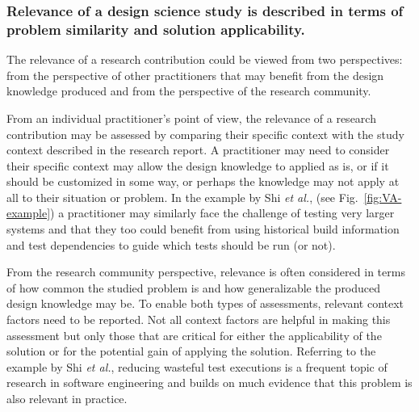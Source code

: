 \documentclass[graybox]{svmult}
\begin{document}

\subsubsection{Relevance of a design science study is described in terms of problem similarity and solution applicability.} 

The relevance of a research contribution could be viewed from two perspectives: from the perspective of other practitioners that may benefit from the design knowledge produced and from the perspective of the research community. 

From an individual practitioner's point of view, the relevance of a research contribution may be assessed by comparing their specific context with the study context described in the research report. 
A practitioner may need to consider their specific context may allow the design knowledge to applied as is, or if it should be customized in some way, or perhaps the knowledge may not apply at all to their situation or problem.
In the example by Shi \emph{et al.}, (see Fig.~\ref{fig:VA-example}) a practitioner may similarly face the challenge of testing very larger systems and  that they too could benefit from using historical build information and test dependencies to guide which tests should be run (or not).

From the research community perspective, relevance is often considered in terms of how common the studied problem is and how generalizable the produced design knowledge may be. To enable both types of assessments, relevant context factors need to be reported. Not all context factors are helpful in making this assessment but only those that are critical for either the applicability of the solution or for the potential gain of applying the solution. 
Referring to the example by Shi \emph{et al.}, reducing wasteful test executions is a frequent topic of research in software engineering and builds on much evidence that this problem is also relevant in practice.
\end{document}
